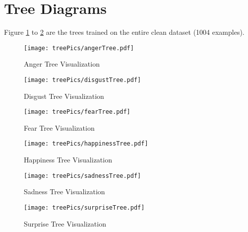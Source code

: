 \documentclass[12pt, a4paper]{article}
\begin{document}
\section*{Tree Diagrams}
Figure \ref{firstTree} to \ref{lastTree} are the trees trained on the entire clean dataset (1004 examples).

\begin{figure}[h!]
\centering
\texttt{[image: treePics/angerTree.pdf]}
\caption{Anger Tree Visualization}
\label{firstTree}
\end{figure}
\begin{figure}[h!]
\centering
\texttt{[image: treePics/disgustTree.pdf]}
\caption{Disgust Tree Visualization}
\end{figure}
\begin{figure}[h!]
\centering
\texttt{[image: treePics/fearTree.pdf]}
\caption{Fear Tree Visualization}
\end{figure}
\begin{figure}[!hb]
\centering
\texttt{[image: treePics/happinessTree.pdf]}
\caption{Happiness Tree Visualization}
\end{figure}
\begin{figure}[!hb]
\centering
\texttt{[image: treePics/sadnessTree.pdf]}
\caption{Sadness Tree Visualization}
\end{figure}
\begin{figure}[!hb]
\centering
\texttt{[image: treePics/surpriseTree.pdf]}
\caption{Surprise Tree Visualization}
\label{lastTree}
\end{figure}
\end{document}
